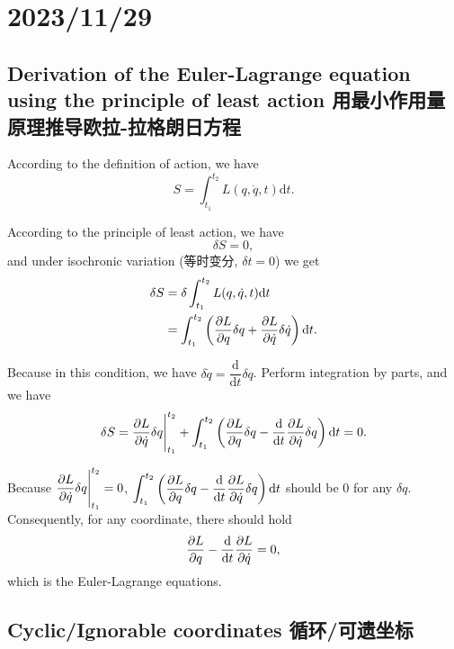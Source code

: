 \chapter{2023/11/29}\label{20231129}

\section{Derivation of the Euler-Lagrange equation using the
principle of least action
用最小作用量原理推导欧拉-拉格朗日方程}\label{derivation-of-the-euler-lagrange-equation-using-the-principle-of-least-action-ux7528ux6700ux5c0fux4f5cux7528ux91cfux539fux7406ux63a8ux5bfcux6b27ux62c9-ux62c9ux683cux6717ux65e5ux65b9ux7a0b}

According to the definition of action, we have
\[S = \int_{t_1}^{t_2} L(q, \dot{q}, t) \mathrm{d}t.\]

According to the principle of least action, we have \[\delta S = 0,\]
and under isochronic variation (等时变分, \(\delta t = 0\)) we get
\begin{align*}
    \delta S & = \delta \int_{t_1}^{t_2} L(q, \dot{q}, t) \mathrm{d}t \\
    & = \int_{t_1}^{t_2} \left( {\partial L \over \partial q} \delta q + {\partial L \over \partial \dot{q}} \delta \dot{q} \right) \mathrm{d}t.
\end{align*}

Because in this condition, we have
\(\delta \dot{q} = \dfrac{\mathrm{d}}{\mathrm{d}t} \delta q\). Perform
integration by parts, and we have
\[\delta S = {\partial L \over \partial \dot{q}} \delta q \Bigg|_{t_1}^{t_2} + \int_{t_1}^{t_2} \left( {\partial L \over \partial q} \delta q - \dfrac{\mathrm{d}}{\mathrm{d}t} {\partial L \over \partial \dot{q}} \delta q \right) \mathrm{d}t = 0.\]

Because
\(\displaystyle {\partial L \over \partial \dot{q}} \delta q \Bigg|_{t_1}^{t_2} = 0\),
\(\displaystyle \int_{t_1}^{t_2} \left( {\partial L \over \partial q} \delta q - \dfrac{\mathrm{d}}{\mathrm{d}t} {\partial L \over \partial \dot{q}} \delta q \right) \mathrm{d}t\)
should be \(0\) for any \(\delta q\). Consequently, for any coordinate,
there should hold
\[{\partial L \over \partial q} - \dfrac{\mathrm{d}}{\mathrm{d}t} {\partial L \over \partial \dot{q}} = 0,\]
which is the Euler-Lagrange equations.

\section{Cyclic/Ignorable coordinates
循环/可遗坐标}\label{cyclicignorable-coordinates-ux5faaux73afux53efux9057ux5750ux6807}

